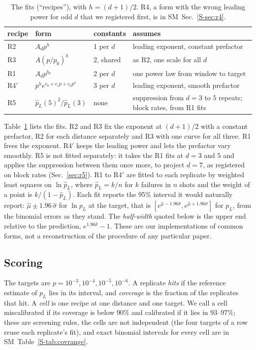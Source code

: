 \documentclass[aps,pre,twocolumn,superscriptaddress,nofootinbib,10pt]{revtex4-2}
\newcommand{\SM}{SM}
\newcommand{\pL}{p_L}
\begin{document}
\begin{table}[t]
\caption{The fits (``recipes''), with $h=(d+1)/2$. R4, a form with the wrong leading power for odd $d$ that we registered first, is in \SM\ Sec.~\ref{S-sec:r4}.}\label{tab:recipes}
\footnotesize
\begin{tabular}{lllp{}}\hline\hline
recipe & form & constants & assumes\\\hline
R2 & $A_dp^{h}$ & 1 per $d$ & leading exponent, constant prefactor\\
R3 & $A(p/p_0)^{h}$ & 2, shared & as R2, one scale for all $d$\\
R1 & $A_dp^{b_d}$ & 2 per $d$ & one power law from window to target\\
R4$'$ & $p^{h}e^{c_0+c_1p+c_2p^2}$ & 3 per $d$ & leading exponent, smooth prefactor\\
R5 & $\hat\pL(5)^2/\hat\pL(3)$ & none & suppression from $d=3$ to $5$ repeats; block rates, from R1 fits\\
\hline\hline
\end{tabular}
\end{table}
Table~\ref{tab:recipes} lists the fits. R2 and R3 fix the exponent at $(d+1)/2$ with a constant prefactor, R2 for each distance separately and R3 with one curve for all three. R1 frees the exponent. R4$'$ keeps the leading power and lets the prefactor vary smoothly. R5 is not fitted separately: it takes the R1 fits at $d=3$ and $5$ and applies the suppression between them once more, to project $d=7$, as registered on block rates (Sec.~\ref{sec:r5}). R1 to R4$'$ are fitted to each replicate by weighted least squares on $\ln\hat\pL$, where $\hat\pL=k/n$ for $k$ failures in $n$ shots and the weight of a point is $k/(1-\hat\pL)$. Each fit reports the 95\% interval it would naturally report: $\hat\mu\pm1.96\,\hat\sigma$ for $\ln\pL$ at the target, that is $[e^{\hat\mu-1.96\hat\sigma},e^{\hat\mu+1.96\hat\sigma}]$ for $\pL$, from the binomial errors as they stand. The \emph{half-width} quoted below is the upper end relative to the prediction, $e^{1.96\hat\sigma}-1$. These are our implementations of common forms, not a reconstruction of the procedure of any particular paper.

\subsection{Scoring}\label{sec:metric}
The targets are $p=10^{-3},10^{-4},10^{-5},10^{-6}$. A replicate \emph{hits} if the reference estimate of $\pL$ lies in its interval, and \emph{coverage} is the fraction of the  replicates that hit. A \emph{cell} is one recipe at one distance and one target. We call a cell miscalibrated if its coverage is below 90\% and calibrated if it lies in 93--97\%; these are screening rules, the cells are not independent (the four targets of a row reuse each replicate's fit), and exact binomial intervals \cite{clopperpearson1934} for every cell are in \SM\ Table~\ref{S-tab:covrange}.
\end{document}
